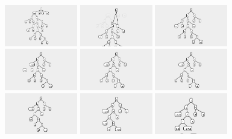\documentclass{article}
\begin{document}
\begin{figure}
\begin{center}
\includegraphics[width=1.25in]{../board/pics/qf1101.png}
\includegraphics[width=1.25in]{../board/pics/qf1551.png}
\includegraphics[width=1.25in]{../board/pics/qf1601.png}
\includegraphics[width=1.25in]{../board/pics/qf1651.png}
\includegraphics[width=1.25in]{../board/pics/qf1701.png}
\includegraphics[width=1.25in]{../board/pics/qf1801.png}
\includegraphics[width=1.25in]{../board/pics/qf1951.png}
\includegraphics[width=1.25in]{../board/pics/qf2001.png}
\includegraphics[width=1.25in]{../board/pics/qf2101.png}

\end{center}
\end{figure}
\end{document}
